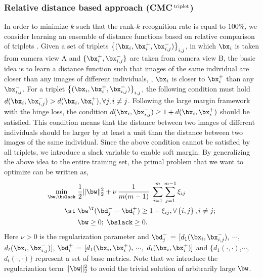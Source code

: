 \documentclass[10pt,twocolumn,letterpaper]{article}
\def\bxi{{\bx_i}}
\def\bxip{{\bx_i^{+}}}
\def\bxijm{{\bx_{i,j}^{-}}}
\def\bdip{{\bd_{i}^{+}}}
\def\bdjm{{\bd_{j}^{-}}}
\def\CMCtriplet{{\rm CMC$^{\,\rm triplet}$}\xspace}
\begin{document}
\subsubsection{Relative distance based approach (\CMCtriplet)}
In order to minimize $k$ such that the rank-$k$ recognition rate
is equal to $100\%$,
we consider learning an ensemble of distance
functions based on relative comparison of triplets \cite{Schultz2004Learning}.
Given a set of triplets
$\left\{(\bxi, \bxip, \bxijm) \right\}_{i,j}$,
in which $\bxi$ is taken from camera view A and
$\{ \bxip, \bxijm \}$ are taken from camera view B,
the basic idea is to learn
a distance function such that
images of the same individual are closer than any images of
different individuals, \ie, $\bxi$ is closer to $\bxip$  than any $\bxijm$.
For a triplet $\left\{ (\bxi, \bxip, \bxijm) \right\}_{i,j}$, the following condition
must hold $d(\bxi,\bxijm) > d(\bxi,\bxip), \forall j, i \neq j$.
Following the large margin framework with the hinge loss, the condition
$d(\bxi,\bxijm) \geq 1 + d(\bxi,\bxip)$ should be satisfied.
This condition means that the distance between two images of
different individuals should be
larger by at least a unit than
the distance between two images of the
same individual.
Since the above condition cannot be satisfied by all triplets,
we introduce a slack variable to enable soft margin.
By generalizing the above idea to the entire training set,
the primal problem that we want to optimize can be written as,
\begin{align}
    \label{EQ:svm}
        \min_{ \bw, \bslack }   \;
        &
         \frac{1}{2} \| \bw  \|_{2}^{2} + \nu \, \frac{1}{m(m-1)} \;
                                \sum_{i=1}^m \sum_{j=1}^{m-1} \xi_{ij}   \\ \notag
        \st \; &
        \bw^\T ( \bdjm - \bdip ) \geq 1 - \xi_{ij}, \forall \left\{i,j\right\}, i \neq j ;
            \\ \notag
        \; &
        \bw \geq 0; \; \bslack \geq 0.
\end{align}
Here $\nu > 0$ is the regularization parameter and
$\bdjm$ = $[d_1(\bxi,\bxijm),$ $\cdots,$ $d_t(\bxi,\bxijm)]$,
$\bdip$ = $[d_1(\bxi,\bxip),$ $\cdots,$ $d_t(\bxi,\bxip)]$ and
$\{d_1(\cdot,\cdot)$,$\cdots$,$d_t(\cdot,\cdot)\}$ represent
a set of base metrics.
Note that we introduce the regularization term $\| \bw \|_{2}^2$ to avoid the trivial solution
of arbitrarily large $\bw$.
\end{document}
